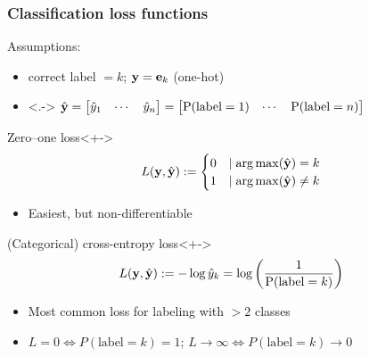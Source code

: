 \begin{frame}
    \frametitle{Classification loss functions}
    Assumptions:
    \begin{itemize}
        \item<+-> correct label $= k$; $\mathbf{y} = \mathbf{e}_k$ (one-hot)
        \item<.-> $\hat{\mathbf{y}} =
        \begin{bmatrix}
            \hat{y}_1 & \cdots & \hat{y}_n
        \end{bmatrix} =
        \begin{bmatrix}
            \operatorname{\mathrm{P}}(\text{label} = 1) & \cdots & \operatorname{\mathrm{P}}(\text{label} = n)
        \end{bmatrix}$
    \end{itemize}

    \begin{block}{Zero--one loss}<+->
        \begin{equation*}
            L(\mathbf{y}, \hat{\mathbf{y}}) := \begin{cases}
                0 &\mid \operatorname*{arg\,max}(\hat{\mathbf{y}}) = k \\
                1 &\mid \operatorname*{arg\,max}(\hat{\mathbf{y}}) \ne k
            \end{cases}
        \end{equation*}
        \begin{itemize}
            \item Easiest, but non-differentiable
        \end{itemize}
    \end{block}

    \begin{block}{(Categorical) cross-entropy loss}<+->
        \begin{equation*}
            L(\mathbf{y}, \hat{\mathbf{y}}) := -\log\hat{y}_k = \log\left(\dfrac{1}{\operatorname{\mathrm{P}}(\text{label} = k)}\right)
        \end{equation*}
        \begin{itemize}
            \item Most common loss for labeling with $> 2$ classes
            \item $L = 0 \iff P(\text{label} = k) = 1$;
            $L \to \infty \iff P(\text{label} = k) \to 0$
        \end{itemize}
    \end{block}
\end{frame}

